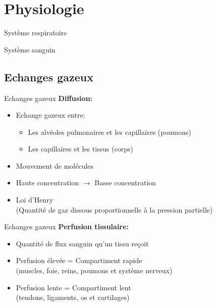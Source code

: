 
\section{Physiologie}

\begin{frame}{Système respiratoire}
\end{frame}

\begin{frame}{Système sanguin}
\end{frame}

\subsection{Echanges gazeux}

\begin{frame}{Echanges gazeux}  
	\textbf{Diffusion:}
	\begin{itemize}
		\item Echange gazeux entre:
		\begin{itemize}
		 	\item Les alvéoles pulmonaires et les capillaires (poumons)
		 	\item Les capillaires et les tissus (corps)
		 \end{itemize}
		\item Mouvement de molécules
		\item Haute concentration $\rightarrow$ Basse concentration
		\item Loi d'Henry\\ (Quantité de gaz dissous proportionnelle à la pression partielle)
	\end{itemize}
\end{frame}

\begin{frame}{Echanges gazeux}  
	\textbf{Perfusion tissulaire:}
	\begin{itemize}
		\item Quantité de flux sanguin qu'un tissu reçoit
		\item Perfusion élevée = Compartiment rapide\\(muscles, foie, reins, poumons et système nerveux)
		\item Perfusion lente = Compartiment lent\\(tendons, ligaments, os et cartilages)
	\end{itemize}
\end{frame}

